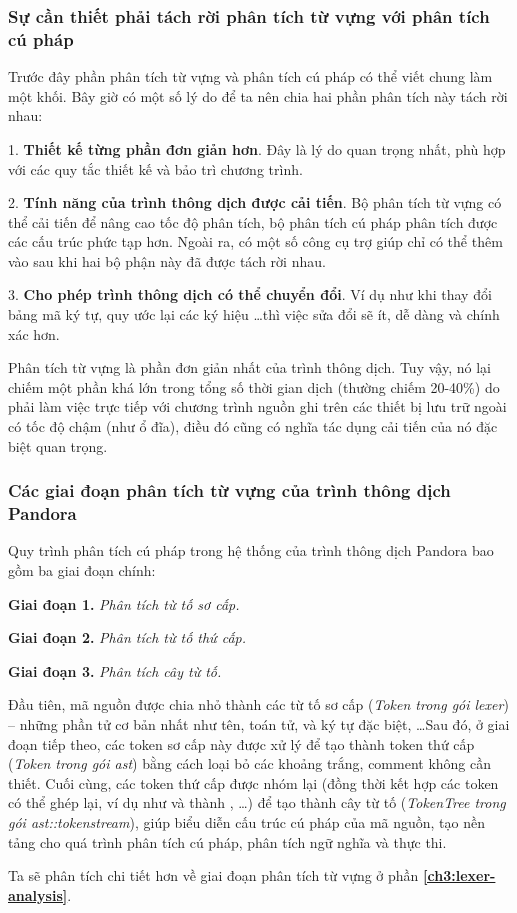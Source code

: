 \subsubsection{Sự cần thiết phải tách rời phân tích từ vựng với phân tích cú pháp}
Trước đây phần phân tích từ vựng và phân tích cú pháp có thể viết chung làm một khối. Bây giờ có một số lý do để ta nên chia hai phần phân tích này tách rời nhau:

1. \textbf{Thiết kế từng phần đơn giản hơn}. Đây là lý do quan trọng nhất, phù hợp với các quy tắc thiết kế và bảo trì chương trình.

2. \textbf{Tính năng của trình thông dịch được cải tiến}. Bộ phân tích từ vựng có thể cải tiến để nâng cao tốc độ phân tích, bộ phân tích cú pháp phân tích được các cấu trúc phức tạp hơn. Ngoài ra, có một số công cụ trợ giúp chỉ có thể thêm vào sau khi hai bộ phận này đã được tách rời nhau.

3. \textbf{Cho phép trình thông dịch có thể chuyển đổi}. Ví dụ như khi thay đổi bảng mã ký tự, quy ước lại các ký hiệu \dots\space thì việc sửa đổi sẽ ít, dễ dàng và chính xác hơn.

    Phân tích từ vựng là phần đơn giản nhất của trình thông dịch. Tuy vậy, nó lại chiếm một phần khá lớn trong tổng số thời gian dịch (thường chiếm 20-40\%) do phải làm việc trực tiếp với chương trình nguồn ghi trên các thiết bị lưu trữ ngoài có tốc độ chậm (như ổ đĩa), điều đó cũng có nghĩa tác dụng cải tiến của nó đặc biệt quan trọng.

\subsubsection{Các giai đoạn phân tích từ vựng của trình thông dịch Pandora}
Quy trình phân tích cú pháp trong hệ thống của trình thông dịch Pandora bao gồm ba giai đoạn chính:

\textbf{Giai đoạn 1.} \textit{Phân tích từ tố sơ cấp.}

\textbf{Giai đoạn 2.} \textit{Phân tích từ tố thứ cấp.}

\textbf{Giai đoạn 3.} \textit{Phân tích cây từ tố.}

    Đầu tiên, mã nguồn được chia nhỏ thành các từ tố sơ cấp (\textit{Token trong gói lexer}) – những phần tử cơ bản nhất như tên, toán tử, và ký tự đặc biệt, \dots Sau đó, ở giai đoạn tiếp theo, các token sơ cấp này được xử lý để tạo thành token thứ cấp (\textit{Token trong gói ast}) bằng cách loại bỏ các khoảng trắng, comment không cần thiết. Cuối cùng, các token thứ cấp được nhóm lại (đồng thời kết hợp các token có thể ghép lại, ví dụ như \kw{<} và \kw{=} thành \kw{<=}, \dots) để tạo thành cây từ tố (\textit{TokenTree trong gói ast::tokenstream}), giúp biểu diễn cấu trúc cú pháp của mã nguồn, tạo nền tảng cho quá trình phân tích cú pháp, phân tích ngữ nghĩa và thực thi. 

    Ta sẽ phân tích chi tiết hơn về giai đoạn phân tích từ vựng ở phần \textbf{\ref{ch3:lexer-analysis}}.
